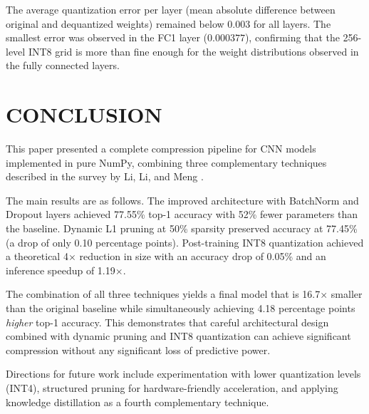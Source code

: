 \documentclass[letterpaper, 10 pt, conference]{ieeeconf}
\begin{document}
The average quantization error per layer (mean absolute difference between original and dequantized weights) remained below $0.003$ for all layers.
The smallest error was observed in the FC1 layer ($0.000377$), confirming that the 256-level INT8 grid is more than fine enough for the weight distributions observed in the fully connected layers.

\section{\textbf{CONCLUSION}}

This paper presented a complete compression pipeline for CNN models implemented in pure NumPy, combining three complementary techniques described in the survey by Li, Li, and Meng \cite{li2023survey}.

The main results are as follows.
The improved architecture with BatchNorm and Dropout layers achieved 77.55\% top-1 accuracy with 52\% fewer parameters than the baseline.
Dynamic L1 pruning at 50\% sparsity preserved accuracy at 77.45\% (a drop of only 0.10 percentage points).
Post-training INT8 quantization achieved a theoretical 4$\times$ reduction in size with an accuracy drop of 0.05\% and an inference speedup of 1.19$\times$.

The combination of all three techniques yields a final model that is 16.7$\times$ smaller than the original baseline while simultaneously achieving 4.18 percentage points \textit{higher} top-1 accuracy.
This demonstrates that careful architectural design combined with dynamic pruning and INT8 quantization can achieve significant compression without any significant loss of predictive power.

Directions for future work include experimentation with lower quantization levels (INT4), structured pruning for hardware-friendly acceleration, and applying knowledge distillation as a fourth complementary technique.

\end{document}

